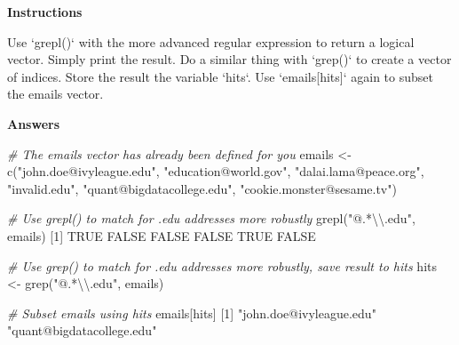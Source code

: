 \documentclass[]{article}
\newcommand{\hlnum}[1]{\textcolor[rgb]{0.816,0.125,0.439}{#1}}%
\newcommand{\hlstr}[1]{\textcolor[rgb]{0.251,0.627,0.251}{#1}}%
\newcommand{\hlcom}[1]{\textcolor[rgb]{0.502,0.502,0.502}{\textit{#1}}}%
\newcommand{\hlstd}[1]{\textcolor[rgb]{0.251,0.251,0.251}{#1}}%
\newcommand{\hlkwc}[1]{\textcolor[rgb]{0.251,0.251,0.251}{#1}}%
\newcommand{\hlkwd}[1]{\textcolor[rgb]{0.878,0.439,0.125}{#1}}%
\newenvironment{Shaded}{\begin{myshaded}}{\end{myshaded}}
\newcommand{\KeywordTok}[1]{\hlkwd{#1}}
\newcommand{\DataTypeTok}[1]{\hlkwc{#1}}
\newcommand{\DecValTok}[1]{\hlnum{#1}}
\newcommand{\CharTok}[1]{\hlstr{#1}}
\newcommand{\StringTok}[1]{\hlstr{#1}}
\newcommand{\CommentTok}[1]{\hlcom{#1}}
\newcommand{\OtherTok}[1]{{#1}}
\newcommand{\NormalTok}[1]{\hlstd{#1}}
\begin{document}
\textbf{Instructions}

\begin{Shaded}
\begin{Highlighting}[]
\OperatorTok{*}\StringTok{ }\NormalTok{Use }\StringTok{`}\DataTypeTok{grepl()}\StringTok{`}\NormalTok{ with the more advanced regular expression to return a logical vector. Simply print the result.}
\OperatorTok{*}\StringTok{ }\NormalTok{Do a similar thing with }\StringTok{`}\DataTypeTok{grep()}\StringTok{`}\NormalTok{ to create a vector of indices. Store the result }\NormalTok{ the variable }\StringTok{`}\DataTypeTok{hits}\StringTok{`}\NormalTok{.}
\OperatorTok{*}\StringTok{ }\NormalTok{Use }\StringTok{`}\DataTypeTok{emails[hits]}\StringTok{`}\NormalTok{ again to subset the emails vector.}
\end{Highlighting}
\end{Shaded}

\textbf{Answers}

\begin{Shaded}
\begin{Highlighting}[]
\CommentTok{# The emails vector has already been defined for you}
\NormalTok{emails <-}\StringTok{ }\KeywordTok{c}\NormalTok{(}\StringTok{"john.doe@ivyleague.edu"}\NormalTok{, }\StringTok{"education@world.gov"}\NormalTok{, }\StringTok{"dalai.lama@peace.org"}\NormalTok{,}
            \StringTok{"invalid.edu"}\NormalTok{, }\StringTok{"quant@bigdatacollege.edu"}\NormalTok{, }\StringTok{"cookie.monster@sesame.tv"}\NormalTok{)}

\CommentTok{# Use grepl() to match for .edu addresses more robustly}
\KeywordTok{grepl}\NormalTok{(}\StringTok{"@.*}\CharTok{\textbackslash{}\textbackslash{}}\StringTok{.edu"}\NormalTok{, emails)}
\NormalTok{   [}\DecValTok{1}\NormalTok{]  }\OtherTok{TRUE} \OtherTok{FALSE} \OtherTok{FALSE} \OtherTok{FALSE}  \OtherTok{TRUE} \OtherTok{FALSE}

\CommentTok{# Use grep() to match for .edu addresses more robustly, save result to hits}
\NormalTok{hits <-}\StringTok{ }\KeywordTok{grep}\NormalTok{(}\StringTok{"@.*}\CharTok{\textbackslash{}\textbackslash{}}\StringTok{.edu"}\NormalTok{, emails)}

\CommentTok{# Subset emails using hits}
\NormalTok{emails[hits]}
\NormalTok{   [}\DecValTok{1}\NormalTok{] }\StringTok{"john.doe@ivyleague.edu"}   \StringTok{"quant@bigdatacollege.edu"}
\end{Highlighting}
\end{Shaded}
\end{document}
